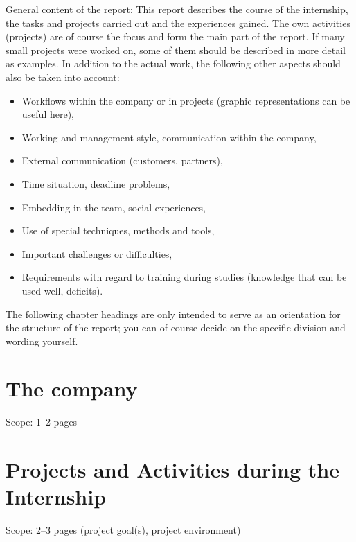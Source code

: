 \documentclass[type=internship,theme=fhooe24,language=english,titlelanguage=english,smartquotes]{hgbthesis}
\begin{document}
General content of the report: This report describes the course of the
internship, the tasks and projects carried out and the experiences gained. The
own activities (projects) are of course the focus and form the main part of the
report. If many small projects were worked on, some of them should be described
in more detail as examples. In addition to the actual work, the following other
aspects should also be taken into account:
%
\begin{itemize}
	\item Workflows within the company or in projects (graphic representations
	can be useful here),
	\item Working and management style, communication within the company,
	\item External communication (customers, partners),
	\item Time situation, deadline problems,
	\item Embedding in the team, social experiences,
	\item Use of special techniques, methods and tools,
	\item Important challenges or difficulties,
	\item Requirements with regard to training during studies (knowledge that
	can be used well, deficits).
\end{itemize}
%
The following chapter headings are only intended to serve as an orientation for
the structure of the report; you can of course decide on the specific division
and wording yourself.

\mainmatter                                    %

\chapter{The company}

Scope: 1--2 pages


\chapter{Projects and Activities during the Internship}

Scope: 2--3 pages (project goal(s), project environment)
\end{document}
